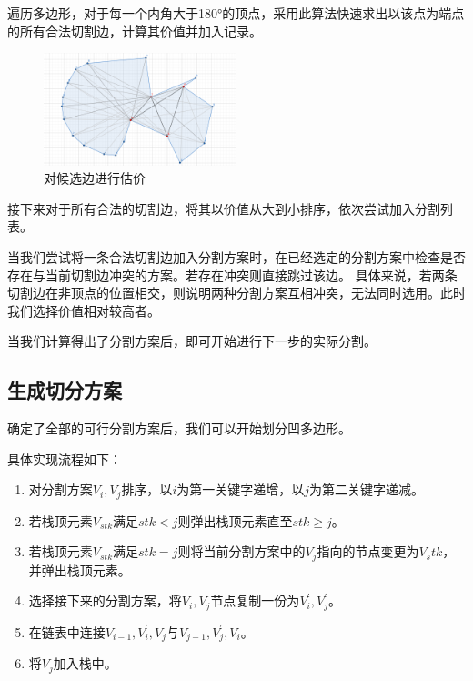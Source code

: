 遍历多边形，对于每一个内角大于180°的顶点，采用此算法快速求出以该点为端点的所有合法切割边，计算其价值并加入记录。

\begin{figure}[htp]
    \centering
    \includegraphics[width=0.5\textwidth]
    {figures/pass1.png}
    \caption{对候选边进行估价}
    \label{pass1}
\end{figure}

接下来对于所有合法的切割边，将其以价值从大到小排序，依次尝试加入分割列表。

当我们尝试将一条合法切割边加入分割方案时，在已经选定的分割方案中检查是否存在与当前切割边冲突的方案。若存在冲突则直接跳过该边。
具体来说，若两条切割边在非顶点的位置相交，则说明两种分割方案互相冲突，无法同时选用。此时我们选择价值相对较高者。

当我们计算得出了分割方案后，即可开始进行下一步的实际分割。

\subsection{生成切分方案}

确定了全部的可行分割方案后，我们可以开始划分凹多边形。

具体实现流程如下：
\begin{enumerate}
    \item 对分割方案\(V_i,V_j\)排序，以\(i\)为第一关键字递增，以\(j\)为第二关键字递减。
    \item 若栈顶元素\(V_{stk}\)满足\(stk<j\)则弹出栈顶元素直至\(stk\ge j\)。
    \item 若栈顶元素\(V_{stk}\)满足\(stk=j\)则将当前分割方案中的\(V_j\)指向的节点变更为\(V_stk\)，并弹出栈顶元素。
    \item 选择接下来的分割方案，将\(V_i,V_j\)节点复制一份为\(V_{i}^{'},V_{j}^{'}\)。
    \item 在链表中连接\(V_{i-1},V_i^{'},V_j\)与\(V_{j-1},V_j^{'},V_i\)。
    \item 将\(V_j\)加入栈中。
\end{enumerate}

